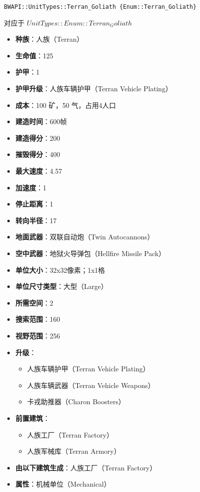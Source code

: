 \begin{tcolorbox}[colback=white, colframe=black!60!white, title=Terran\_Goliath(), arc=0mm]
\begin{verbatim}
BWAPI::UnitTypes::Terran_Goliath {Enum::Terran_Goliath}
\end{verbatim}
对应于  $UnitTypes::Enum::Terran_Goliath$ 
\begin{itemize}
    \item \textbf{种族}：人族（Terran）
    \item \textbf{生命值}：125
    \item \textbf{护甲}：1
    \item \textbf{护甲升级}：人族车辆护甲（Terran Vehicle Plating）
    \item \textbf{成本}：100 矿，50 气，占用4人口
    \item \textbf{建造时间}：600帧
    \item \textbf{建造得分}：200
    \item \textbf{摧毁得分}：400
    \item \textbf{最大速度}：4.57
    \item \textbf{加速度}：1
    \item \textbf{停止距离}：1
    \item \textbf{转向半径}：17
    \item \textbf{地面武器}：双联自动炮（Twin Autocannons）
    \item \textbf{空中武器}：地狱火导弹包（Hellfire Missile Pack）
    \item \textbf{单位大小}：32x32像素；1x1格
    \item \textbf{单位尺寸类型}：大型（Large）
    \item \textbf{所需空间}：2
    \item \textbf{搜索范围}：160
    \item \textbf{视野范围}：256
    \item \textbf{升级}：
        \begin{itemize}
            \item 人族车辆护甲（Terran Vehicle Plating）
            \item 人族车辆武器（Terran Vehicle Weapons）
            \item 卡戎助推器（Charon Boosters）
        \end{itemize}
    \item \textbf{前置建筑}：
        \begin{itemize}
            \item 人族工厂（Terran Factory）
            \item 人族军械库（Terran Armory）
        \end{itemize}
    \item \textbf{由以下建筑生成}：人族工厂（Terran Factory）
    \item \textbf{属性}：机械单位（Mechanical）
\end{itemize}
\end{tcolorbox}

